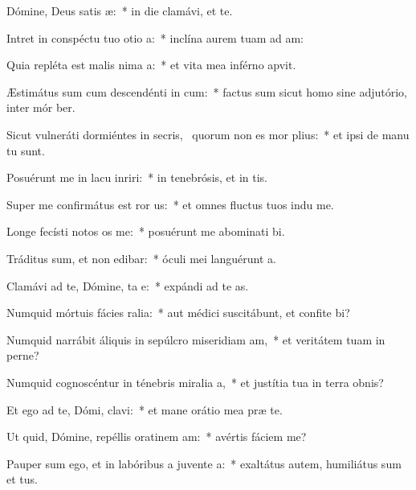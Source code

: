 \item Dómine, Deus satis æ:~* in die clamávi, et   te.
\item Intret in conspéctu tuo otio a:~* inclína aurem tuam ad  am:
\item Quia repléta est malis nima a:~* et vita mea inférno apvit.
\item Æstimátus sum cum descendénti in cum:~* factus sum sicut homo sine adjutório, inter mór ber.
\item Sicut vulneráti dormiéntes in secris,~\pscross{} quorum non es mor plius:~* et ipsi de manu tu  sunt.
\item Posuérunt me in lacu inriri:~* in tenebrósis, et in  tis.
\item Super me confirmátus est ror us:~* et omnes fluctus tuos indu  me.
\item Longe fecísti notos os  me:~* posuérunt me abominati bi.
\item Tráditus sum, et non edibar:~* óculi mei languérunt  a.
\item Clamávi ad te, Dómine, ta e:~* expándi ad te  as.
\item Numquid mórtuis fácies ralia:~* aut médici suscitábunt, et confite bi?
\item Numquid narrábit áliquis in sepúlcro miseridiam am,~* et veritátem tuam in perne?
\item Numquid cognoscéntur in ténebris miralia a,~* et justítia tua in terra obnis?
\item Et ego ad te, Dómi, clavi:~* et mane orátio mea præ te.
\item Ut quid, Dómine, repéllis oratinem am:~* avértis fáciem   me?
\item Pauper sum ego, et in labóribus a juvente a:~* exaltátus autem, humiliátus sum et tus.
